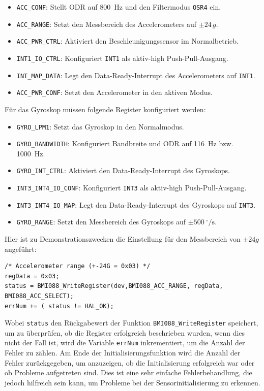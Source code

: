 \begin{itemize}
    \item \texttt{ACC\_CONF}: Stellt ODR auf \SI{800}{Hz} und den Filtermodus \texttt{OSR4} ein.
    \item \texttt{ACC\_RANGE}: Setzt den Messbereich des Accelerometers auf \(\pm24\,g\).
    \item \texttt{ACC\_PWR\_CTRL}: Aktiviert den Beschleunigungssensor im Normalbetrieb.
    \item \texttt{INT1\_IO\_CTRL}: Konfiguriert \texttt{INT1} als aktiv-high Push-Pull-Ausgang.
    \item \texttt{INT\_MAP\_DATA}: Legt den Data-Ready-Interrupt des Accelerometers auf \texttt{INT1}.
    \item \texttt{ACC\_PWR\_CONF}: Setzt den Accelerometer in den aktiven Modus.
\end{itemize}
Für das Gyroskop müssen folgende Register konfiguriert werden:
\begin{itemize}
    \item \texttt{GYRO\_LPM1}: Setzt das Gyroskop in den Normalmodus.
    \item \texttt{GYRO\_BANDWIDTH}: Konfiguriert Bandbreite und ODR auf \SI{116}{Hz} bzw. \SI{1000}{Hz}.
    \item \texttt{GYRO\_INT\_CTRL}: Aktiviert den Data-Ready-Interrupt des Gyroskops.
    \item \texttt{INT3\_INT4\_IO\_CONF}: Konfiguriert \texttt{INT3} als aktiv-high Push-Pull-Ausgang.
    \item \texttt{INT3\_INT4\_IO\_MAP}: Legt den Data-Ready-Interrupt des Gyroskops auf \texttt{INT3}.
    \item \texttt{GYRO\_RANGE}: Setzt den Messbereich des Gyroskops auf \(\pm500~^\circ/\text{s}\).
\end{itemize}

Hier ist zu Demonstrationszwecken die Einstellung für den Messbereich von $\pm 24g$ angeführt:
\begin{lstlisting}[style=cstyle, caption={Sensor 
konfigurieren}, label={lst:configure_sensor}]
/* Accelerometer range (+-24G = 0x03) */
regData = 0x03;
status = BMI088_WriteRegister(dev,BMI088_ACC_RANGE, regData, BMI088_ACC_SELECT);
errNum += ( status != HAL_OK);
\end{lstlisting}
Wobei \texttt{status} den Rückgabewert der Funktion \texttt{BMI088\_WriteRegister} speichert, um zu überprüfen, ob die Register erfolgreich beschrieben wurden, wenn dies nicht der Fall ist, wird die Variable \texttt{errNum} inkrementiert, um die Anzahl der Fehler zu zählen. Am Ende der Initialisierungsfunktion wird die Anzahl der Fehler zurückgegeben, um anzuzeigen, ob die Initialisierung erfolgreich war oder ob Probleme aufgetreten sind. Dies ist eine sehr einfache Fehlerbehandlung, die jedoch hilfreich sein kann, um Probleme bei der Sensorinitialisierung zu erkennen.
